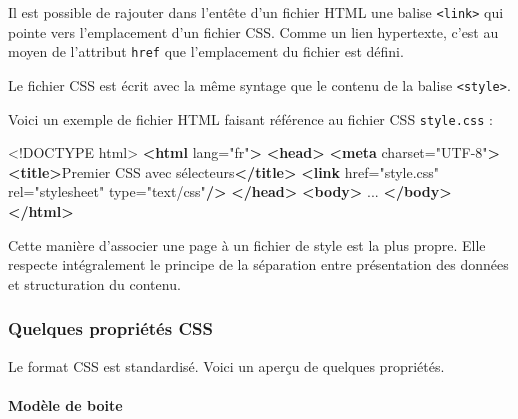 \documentclass[a4paper,17pt]{extarticle}
\newenvironment{Shaded}{}{}
\newcommand{\KeywordTok}[1]{\textcolor[rgb]{0.00,0.44,0.13}{\textbf{{#1}}}}
\newcommand{\DataTypeTok}[1]{\textcolor[rgb]{0.56,0.13,0.00}{{#1}}}
\newcommand{\StringTok}[1]{\textcolor[rgb]{0.25,0.44,0.63}{{#1}}}
\newcommand{\OtherTok}[1]{\textcolor[rgb]{0.00,0.44,0.13}{{#1}}}
\newcommand{\NormalTok}[1]{{#1}}
\begin{document}
    Il est possible de rajouter dans l'entête d'un fichier HTML une balise
\texttt{\textless{}link\textgreater{}} qui pointe vers l'emplacement
d'un fichier CSS. Comme un lien hypertexte, c'est au moyen de l'attribut
\texttt{href} que l'emplacement du fichier est défini.

Le fichier CSS est écrit avec la même syntage que le contenu de la
balise \texttt{\textless{}style\textgreater{}}.
\begin{exemple}
    Voici un exemple de fichier HTML faisant référence au fichier CSS
\texttt{style.css} :

\begin{Shaded}
\begin{Highlighting}[]
\DataTypeTok{\textless{}!DOCTYPE }\NormalTok{html}\DataTypeTok{\textgreater{}}
\KeywordTok{\textless{}html}\OtherTok{ lang=}\StringTok{"fr"}\KeywordTok{\textgreater{}}
\KeywordTok{\textless{}head\textgreater{}}
    \KeywordTok{\textless{}meta}\OtherTok{ charset=}\StringTok{"UTF{-}8"}\KeywordTok{\textgreater{}}
    \KeywordTok{\textless{}title\textgreater{}}\NormalTok{Premier CSS avec sélecteurs}\KeywordTok{\textless{}/title\textgreater{}}
    \KeywordTok{\textless{}link}\OtherTok{ href=}\StringTok{"style.css"}\OtherTok{ rel=}\StringTok{"stylesheet"}\OtherTok{ type=}\StringTok{"text/css"}\KeywordTok{/\textgreater{}}
\KeywordTok{\textless{}/head\textgreater{}}
\KeywordTok{\textless{}body\textgreater{}}
\NormalTok{    ...}
\KeywordTok{\textless{}/body\textgreater{}}
\KeywordTok{\textless{}/html\textgreater{}}
\end{Highlighting}
\end{Shaded}

            \end{exemple}
    Cette manière d'associer une page à un fichier de style est la plus
propre. Elle respecte intégralement le principe de la séparation entre
présentation des données et structuration du contenu.

    \hypertarget{quelques-propriuxe9tuxe9s-css}{%
\subsubsection{Quelques propriétés
CSS}\label{quelques-propriuxe9tuxe9s-css}}

    Le format CSS est standardisé. Voici un aperçu de quelques propriétés.

    \hypertarget{moduxe8le-de-boite}{%
\paragraph{Modèle de boite}\label{moduxe8le-de-boite}}
\end{document}
